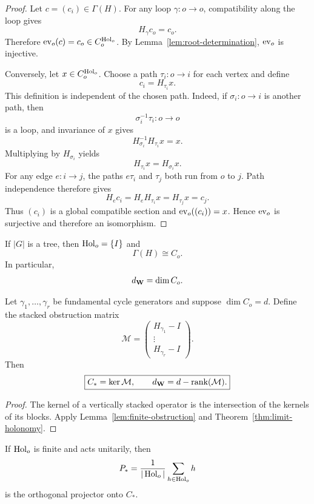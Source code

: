 \begin{proof}
Let \(c=(c_i)\in\Gamma(H)\). For any loop \(\gamma:o\to o\), compatibility
along the loop gives
\[
H_\gamma c_o=c_o.
\]
Therefore \(\operatorname{ev}_o(c)=c_o\in C_o^{\operatorname{Hol}_o}\). By
Lemma~\ref{lem:root-determination}, \(\operatorname{ev}_o\) is injective.

Conversely, let \(x\in C_o^{\operatorname{Hol}_o}\). Choose a path
\(\tau_i:o\to i\) for each vertex and define
\[
c_i=H_{\tau_i}x.
\]
This definition is independent of the chosen path. Indeed, if
\(\sigma_i:o\to i\) is another path, then
\[
\sigma_i^{-1}\tau_i:o\to o
\]
is a loop, and invariance of \(x\) gives
\[
H_{\sigma_i}^{-1}H_{\tau_i}x=x.
\]
Multiplying by \(H_{\sigma_i}\) yields
\[
H_{\tau_i}x=H_{\sigma_i}x.
\]
For any edge \(e:i\to j\), the paths \(e\tau_i\) and \(\tau_j\) both run
from \(o\) to \(j\). Path independence therefore gives
\[
H_ec_i
=H_eH_{\tau_i}x
=H_{\tau_j}x
=c_j.
\]
Thus \((c_i)\) is a global compatible section and \(\operatorname{ev}_o((c_i))=x\).
Hence \(\operatorname{ev}_o\) is surjective and therefore an isomorphism.
\end{proof}

\begin{corollary}\label{cor:tree-core}
If \(|G|\) is a tree, then \(\operatorname{Hol}_o=\{I\}\) and
\[
\Gamma(H)\cong C_o.
\]
In particular,
\[
d_{\mathbf W}=\dim C_o.
\]
\end{corollary}

\begin{corollary}\label{cor:finite-matrix-test}
Let \(\gamma_1,\ldots,\gamma_r\) be fundamental cycle generators and suppose
\(\dim C_o=d\). Define the stacked obstruction matrix
\[
\mathcal M
=
\begin{pmatrix}
H_{\gamma_1}-I\\
\vdots\\
H_{\gamma_r}-I
\end{pmatrix}.
\]
Then
\[
\boxed{
C_*=\ker\mathcal M,
\qquad
d_{\mathbf W}=d-\operatorname{rank}(\mathcal M).
}
\]
\end{corollary}

\begin{proof}
The kernel of a vertically stacked operator is the intersection of the kernels
of its blocks. Apply Lemma~\ref{lem:finite-obstruction} and
Theorem~\ref{thm:limit-holonomy}.
\end{proof}

\begin{corollary}\label{cor:averaging-projector}
If \(\operatorname{Hol}_o\) is finite and acts unitarily, then
\[
P_*=
\frac{1}{|\operatorname{Hol}_o|}
\sum_{h\in\operatorname{Hol}_o}h
\]
is the orthogonal projector onto \(C_*\).
\end{corollary}

